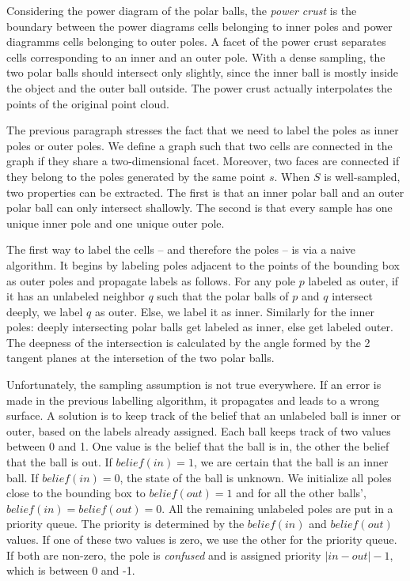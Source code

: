 \documentclass[12pt]{article}
\begin{document}
Considering the power diagram of the polar balls, the \textit{power crust} is the boundary between the power diagrams cells belonging to inner poles and power diagramms cells belonging to outer poles. A facet of the power crust separates cells corresponding to an inner and an outer pole. With a dense sampling, the two polar balls should intersect only slightly, since the inner ball is mostly inside the object and the outer ball outside. The power crust actually interpolates the points of the original point cloud.

The previous paragraph stresses the fact that we need to label the poles as inner poles or outer poles. We define a graph such that two cells are connected in the graph if they share a two-dimensional facet. Moreover, two faces are connected if they belong to the poles generated by the same point $s$. When $S$ is well-sampled, two properties can be extracted. The first is that an inner polar ball and an outer polar ball can only intersect shallowly. The second is that every sample has one unique inner pole and one unique outer pole. 

The first way to label the cells -- and therefore the poles -- is via a naive algorithm. It begins by labeling poles adjacent to the points of the bounding box as outer poles and propagate labels as follows. For any pole $p$ labeled as outer, if it has an unlabeled neighbor $q$ such that the polar balls of $p$ and $q$ intersect deeply, we label $q$ as outer. Else, we label it as inner. Similarly for the inner poles: deeply intersecting polar balls get labeled as inner, else get labeled outer. The deepness of the intersection is calculated by the angle formed by the 2 tangent planes at the intersetion of the two polar balls.

Unfortunately, the sampling assumption is not true everywhere. If an error is made in the previous labelling algorithm, it propagates and leads to a wrong surface. A solution is to keep track of the belief that an unlabeled ball is inner or outer, based on the labels already assigned. Each ball keeps track of two values between 0 and 1. One value is the belief that the ball is in, the other the belief that the ball is out. If $belief(in) = 1$, we are certain that the ball is an inner ball. If $belief(in) = 0$, the state of the ball is unknown. We initialize all poles close to the bounding box to $belief(out) = 1$ and for all the other balls', $belief(in) = belief(out) = 0$.
All the remaining unlabeled poles are put in a priority queue. The priority is determined by the $belief(in)$ and $belief(out)$ values. If one of these two values is zero, we use the other for the priority queue. If both are non-zero, the pole is \textit{confused} and is assigned priority $|in - out| - 1$, which is between 0 and -1.
\end{document}

